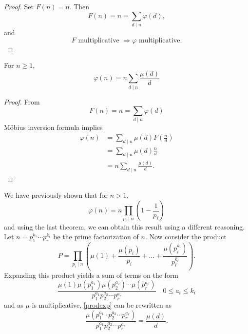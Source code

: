 \documentclass{report}
\begin{document}
\begin{proof}
	Set $F(n)=n$. Then 
	\begin{equation*}
	F(n)=n=\sum_{d\mid n}\varphi(d),
	\end{equation*}
	and
	\begin{equation*}
	F \text{ multiplicative } \Rightarrow \varphi \text{ multiplicative.}
	\end{equation*}
\end{proof}
\newpage
\begin{thm}
	For $n\geq 1$,
	\begin{equation*}
	\varphi(n) = n\sum_{d\mid n}\frac{\mu(d)}{d}
	\end{equation*}
\end{thm}
\begin{proof}
	From 
	\begin{equation*}
	F(n) = n = \sum_{d\mid n} \varphi(d)
	\end{equation*}
	M\"{o}bius inversion formula implies
	\begin{equation*}
	\begin{aligned}
	\varphi(n) &= \sum_{d\mid n}\mu(d)F(\frac{n}{d})\\
	&= \sum_{d\mid n}\mu(d)\frac{n}{d}\\
	&= n\sum_{d\mid n}\frac{\mu(d)}{d}.
	\end{aligned}
	\end{equation*}
\end{proof}
We have previously shown that for $n> 1$, 
\begin{equation*}
\varphi(n) = n\prod_{p_i\mid n}\left(1 - \frac{1}{p_i}\right)
\end{equation*}
and using the last theorem, we can obtain this result using a different reasoning.\\
Let $n=p_1^{k_1}\cdots p_r^{k_r}$ be the prime factorization of $n$. Now consider the product
\begin{equation*}
P=\prod_{p_i\mid n}\left(\mu(1) + \frac{\mu(p_i)}{p_i} + \dots + \frac{\mu(p_i^{k_i})}{p_i^{k_i}}\right).
\end{equation*}
Expanding this product yields a sum of terms on the form
\begin{equation}\label{prodexp}
\frac{\mu(1)\mu(p_1^{a_1})\mu(p_2^{a_2})\cdots\mu(p_r^{a_r})}{p_1^{a_1}p_2^{a_2}\cdots p_r^{a_r}}\quad 0\leq a_i \leq k_i
\end{equation}
and as $\mu$ is multiplicative, \eqref{prodexp} can be rewritten as
\begin{equation*}
\frac{\mu(p_1^{a_1}\cdot p_2^{a_2}\cdots p_r^{a_r})}{p_1^{a_1}p_2^{a_2}\cdots p_r^{a_r}} = \frac{\mu(d)}{d}.
\end{equation*}
\end{document}
